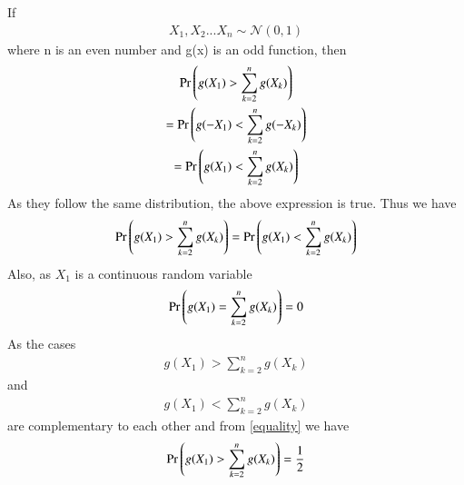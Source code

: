 \documentclass[journal,12pt,twocolumn]{IEEEtran}
\begin{document}
If 
\begin{align}
 X_1,X_2...X_n \sim \mathcal{N}(0,1)   
\end{align}
where n is an even number and g(x) is an odd function, then
\begin{multline}
    \Pr\left(g(X_1)>\sum_{k=2}^ng(X_k)\right)\\=
    \Pr\left(g(-X_1)<\sum_{k=2}^ng(-X_k)\right)\\=
    \Pr\left(g(X_1)<\sum_{k=2}^ng(X_k)\right)
\end{multline}
As they follow the same distribution, the above expression is true. Thus we have
\begin{align}\label{equality}
    \Pr\left(g(X_1)>\sum_{k=2}^ng(X_k)\right)=
    \Pr\left(g(X_1)<\sum_{k=2}^ng(X_k)\right)
\end{align}
Also, as $X_1$ is a continuous random variable
\begin{align}
    \Pr\left(g(X_1)=\sum_{k=2}^ng(X_k)\right)=0
\end{align}
As the cases
\begin{align}
    g(X_1)>\sum_{k=2}^ng(X_k)
\end{align}
and
\begin{align}
    {g(X_1)<\sum_{k=2}^ng(X_k)}
\end{align}
are complementary to each other and from \eqref{equality} we have
\begin{align}\label{sum}
 \Pr\left(g(X_1)>\sum_{k=2}^ng(X_k)\right)=\frac{1}{2}    
\end{align}
\end{document}
